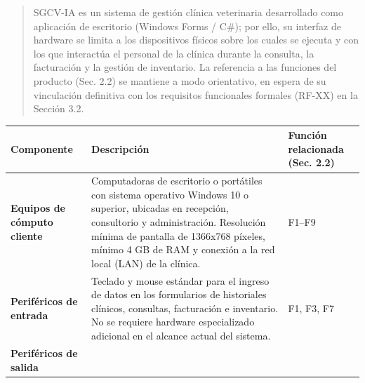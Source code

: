 \documentclass[
]{article}
\newcounter{none} %
\begin{document}
\begin{quote}
SGCV-IA es un sistema de gestión clínica veterinaria desarrollado como
aplicación de escritorio (Windows Forms / C\#); por ello, su interfaz de
hardware se limita a los dispositivos físicos sobre los cuales se
ejecuta y con los que interactúa el personal de la clínica durante la
consulta, la facturación y la gestión de inventario. La referencia a las
funciones del producto (Sec. 2.2) se mantiene a modo orientativo, en
espera de su vinculación definitiva con los requisitos funcionales
formales (RF-XX) en la Sección 3.2.
\end{quote}

{\def\LTcaptype{none} %
\begin{longtable}[]{|
  >{\raggedright\arraybackslash}p{}|
  >{\raggedright\arraybackslash}p{}|
  >{\raggedright\arraybackslash}p{}|}
\hline
\begin{minipage}[b]{\linewidth}\raggedright
\textbf{Componente}
\end{minipage} & \begin{minipage}[b]{\linewidth}\raggedright
\textbf{Descripción}
\end{minipage} & \begin{minipage}[b]{\linewidth}\raggedright
\textbf{Función relacionada (Sec.} \textbf{2.2)}
\end{minipage} \\
\hline
\endhead
\hline
\endlastfoot
\textbf{Equipos de cómputo cliente} &
\begin{minipage}[t]{\linewidth}\raggedright
Computadoras de escritorio o portátiles con sistema operativo Windows 10
o superior, ubicadas en recepción, consultorio y administración.
Resolución mínima de pantalla de 1366x768 píxeles, mínimo 4 GB de RAM y
conexión a la red local (LAN) de la clínica.
\end{minipage} & F1--F9 \\
\hline
\textbf{Periféricos de entrada} &
\begin{minipage}[t]{\linewidth}\raggedright
Teclado y mouse estándar para el ingreso de datos en los formularios de
historiales clínicos, consultas, facturación e inventario. No se
requiere hardware especializado adicional en el alcance actual del sistema.
\end{minipage} & F1, F3, F7 \\
\hline
\textbf{Periféricos de salida} &
\begin{minipage}[t]{\linewidth}\raggedright

\end{minipage}
\end{longtable}}
\end{document}
